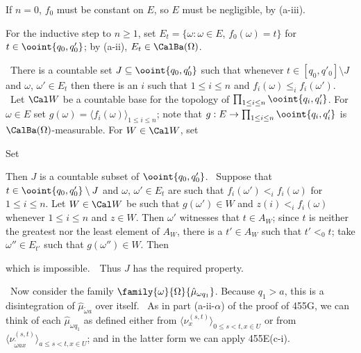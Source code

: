 { If $n=0$, $f_0$ must be constant on $E$, so
$E$ must be negligible, by (a-iii).

\medskip

 For the inductive step to $n\ge 1$, set
$E_t=\{\omega:\omega\in E$, $f_0(\omega)=t\}$ for
$t\in\ooint{q_0,q'_0}$;  by (a-ii),
$E_t\in\CalBa(\Omega)$.

\medskip

\qquad\grheada\ There is a countable
set $J\subseteq\ooint{q_0,q'_0}$ such that whenever
$t\in[q_0,q'_0]\setminus J$ and $\omega$, $\omega'\in E_t$ then
there is an $i$ such that $1\le i\le n$ and $f_i(\omega)\le_if_i(\omega')$.
\Prf\ Let $\Cal W$ be a countable base for the topology of
$\prod_{1\le i\le n}\ooint{q_i,q'_i}$.   For $\omega\in E$ set
$g(\omega)=\langle f_i(\omega)\rangle_{1\le i\le n}$;  note that
$g:E\to\prod_{1\le i\le n}\ooint{q_i,q'_i}$ is
$\CalBa(\Omega)$-measurable.   For $W\in\Cal W$, set


\noindent Set


\noindent Then $J$ is a countable subset of $\ooint{q_0,q'_0}$.
\Quer\ Suppose that $t\in\ooint{q_0,q'_0}\setminus J$ and
$\omega$, $\omega'\in E_t$ are such that $f_i(\omega')<_if_i(\omega)$ for
$1\le i\le n$.   Let $W\in\Cal W$ be such that
$g(\omega')\in W$ and $z(i)<_if_i(\omega)$
whenever $1\le i\le n$ and $z\in W$.   Then $\omega'$ witnesses that
$t\in A_W$;  since $t$ is neither the greatest nor the least element of
$A_W$, there is a $t'\in A_W$ such that $t'<_0t$;
take $\omega''\in E_{t'}$ such that $g(\omega'')\in W$.   Then



\noindent which is impossible.\ \BanG\  Thus
$J$ has the required property.\ \Qed

\medskip

\qquad\grheadb\  Now consider the family
$\family{\omega}{\Omega}{\hat\mu_{\omega q_1}}$.   Because $q_1>a$,
this is a disintegration of $\hat\mu_{\tilde\omega a}$ over itself.
\Prf\ As in part (a-ii-$\alpha$) of the proof of 455G,
we can think of each $\hat\mu_{\omega q_1}$ as defined either from
$\langle\nu^{(s,t)}_x\rangle_{0\le s<t,x\in U}$ or from
$\langle\nu^{(s,t)}_{\tilde\omega ax}\rangle_{a\le s<t,x\in U}$;
and in the latter form we can apply 455E(c-i).\ \Qed

}
